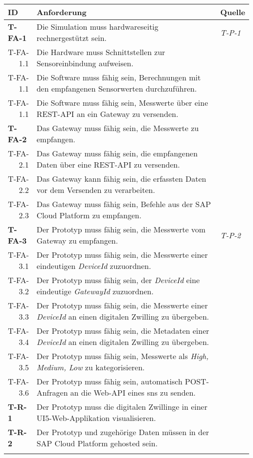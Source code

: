   \begin{tabularx}{\textwidth}{@{}lXp{1.5cm}@{}}
      \toprule
      ID                & Anforderung & Quelle \\
      \midrule
      \endhead
      \textbf{T-FA-1}              &    Die Simulation muss hardwareseitig rechnergestützt sein.       & \textit{T-P-1}                \\
      \multicolumn{1}{r}{T-FA-1.1} &   Die Hardware muss Schnittstellen zur Sensoreinbindung aufweisen. \\
      \multicolumn{1}{r}{T-FA-1.1} &   Die Software muss fähig sein, Berechnungen mit den empfangenen Sensorwerten durchzuführen. \\
      \multicolumn{1}{r}{T-FA-1.1} &   Die Software muss fähig sein, Messwerte über eine REST-API an ein Gateway zu versenden. \\
      \textbf{T-FA-2}              &   Das Gateway muss fähig sein, die Messwerte zu empfangen.   \\
      \multicolumn{1}{r}{T-FA-2.1}     &   Das Gateway muss fähig sein, die empfangenen Daten über eine REST-API zu versenden.   \\
      \multicolumn{1}{r}{T-FA-2.2} & Das Gateway kann fähig sein, die erfassten Daten vor dem Versenden zu verarbeiten. \\
      \multicolumn{1}{r}{T-FA-2.3} & Das Gateway muss fähig sein, Befehle aus der SAP Cloud Platform zu empfangen. \\
      \textbf{T-FA-3}            &      Der Prototyp muss fähig sein, die Messwerte vom Gateway zu empfangen. &    \textit{T-P-2}    \\
      \multicolumn{1}{r}{T-FA-3.1}    &  Der Prototyp muss fähig sein, die Messwerte einer eindeutigen \textit{DeviceId} zuzuordnen. \\
      \multicolumn{1}{r}{T-FA-3.2}    &  Der Prototyp muss fähig sein, der \textit{DeviceId} eine eindeutige \textit{GatewayId} zuzuordnen. \\
      \multicolumn{1}{r}{T-FA-3.3}    &  Der Prototyp muss fähig sein, die Messwerte einer \textit{DeviceId} an einen digitalen Zwilling zu übergeben.\\
      \multicolumn{1}{r}{T-FA-3.4}    &  Der Prototyp muss fähig sein, die Metadaten einer \textit{DeviceId} an einen digitalen Zwilling zu übergeben. \\
      \multicolumn{1}{r}{T-FA-3.5}  &  Der Prototyp muss fähig sein, Messwerte als \textit{High, Medium, Low} zu kategorisieren. \\
      \multicolumn{1}{r}{T-FA-3.6}  &  Der Prototyp muss fähig sein, automatisch POST-Anfragen an die Web-API eines \ac{sns} zu senden.  \\
      \textbf{T-R-1} & Der Prototyp muss die digitalen Zwillinge in einer UI5-Web-Applikation visualisieren. \\
      \textbf{T-R-2} & Der Prototyp und zugehörige Daten müssen in der SAP Cloud Platform gehosted sein.  \\
      \addlinespace
      \bottomrule
      \caption{Anforderungen aus technischer Ebene}
      \label{technik_anforderung}
  \end{tabularx}

  \newpage


